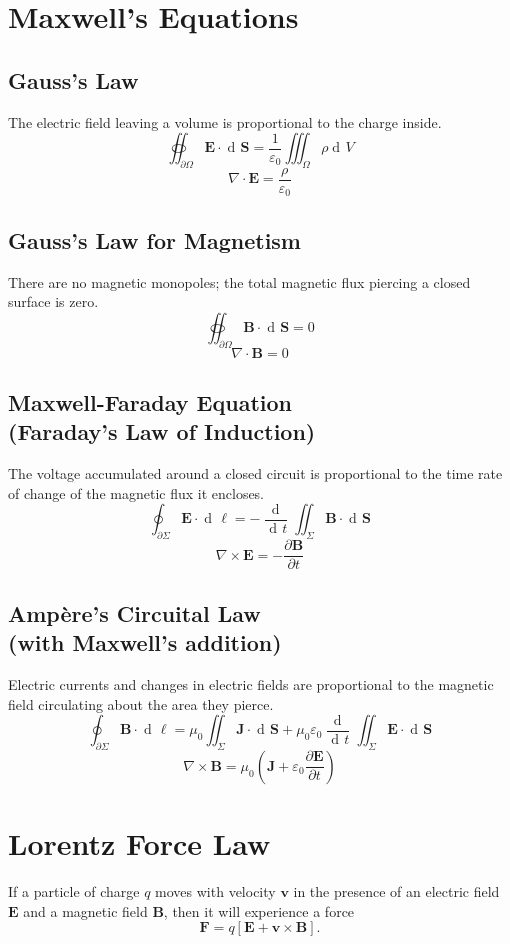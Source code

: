 \documentclass{article}
\newcommand{\vect}[1]{\boldsymbol{#1}}
\DeclareMathOperator{\dif}{d \!}
\begin{document}
\section*{Maxwell's Equations}

\subsection*{Gauss's Law}
The electric field leaving a volume is proportional to the charge inside.
$$ \oiint_{\partial \Omega} \vect{E} \cdot \dif \vect{S}
= \frac{1}{\varepsilon_0}\iiint_\Omega \rho \dif V $$
$$ \nabla \cdot \vect{E} = \frac{\rho}{\varepsilon_0}$$

\subsection*{Gauss's Law for Magnetism}
There are no magnetic monopoles; the total magnetic flux piercing a closed surface is zero.
$$ \oiint_{\partial \Omega} \vect{B} \cdot \dif \vect{S} = 0 $$
$$ \nabla \cdot \vect{B} = 0 $$

\subsection*{Maxwell-Faraday Equation \\ (Faraday's Law of Induction)}
The voltage accumulated around a closed circuit is proportional to the time rate of change of the magnetic flux it encloses.
$$ \oint_{\partial \Sigma} \vect{E} \cdot \dif \vect{\ell}
= -\frac{\dif}{\dif t}\iint_\Sigma \vect{B} \cdot \dif \vect{S} $$
$$ \nabla \times \vect{E} = -\frac{\partial \vect{B}}{\partial t} $$

\begin{samepage}
\subsection*{Amp\`ere's Circuital Law \\ (with Maxwell's addition)}
Electric currents and changes in electric fields are proportional to the magnetic field circulating about the area they pierce.
$$ \oint_{\partial \Sigma} \vect{B} \cdot \dif \vect{\ell}
= \mu_0 \iint_\Sigma \vect{J} \cdot \dif \vect{S} +
\mu_0 \varepsilon_0 \frac{\dif}{\dif t}\iint_\Sigma \vect{E}
\cdot \dif \vect{S} $$
$$ \nabla \times \vect{B} = \mu_0 \left( \vect{J} + \varepsilon_0 \frac{\partial \vect{E}}{\partial t} \right)$$
\end{samepage}

\section*{Lorentz Force Law}
If a particle of charge $q$ moves with velocity $\vect{v}$ in the presence of an electric field $\vect{E}$ and a magnetic field $\vect{B}$, then it will experience a force
$$ \vect{F} = q\left[\vect{E}+\vect{v}\times\vect{B}\right]. $$
\end{document}
